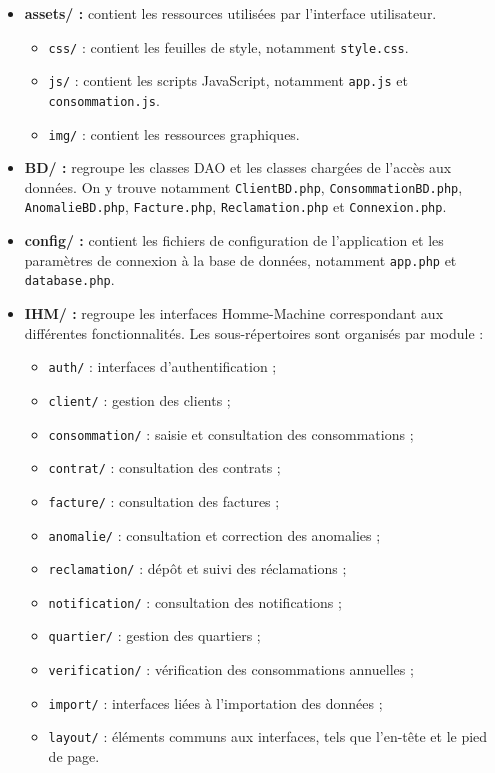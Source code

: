 \begin{itemize}[leftmargin=*]

    \item \textbf{assets/ :} contient les ressources utilisées par l'interface utilisateur.
    \begin{itemize}
        \item \texttt{css/} : contient les feuilles de style, notamment \texttt{style.css}.
        \item \texttt{js/} : contient les scripts JavaScript, notamment \texttt{app.js} et \texttt{consommation.js}.
        \item \texttt{img/} : contient les ressources graphiques.
    \end{itemize}

    \item \textbf{BD/ :} regroupe les classes DAO et les classes chargées de l'accès aux données. On y trouve notamment \texttt{ClientBD.php}, \texttt{ConsommationBD.php}, \texttt{AnomalieBD.php}, \texttt{Facture.php}, \texttt{Reclamation.php} et \texttt{Connexion.php}.

    \item \textbf{config/ :} contient les fichiers de configuration de l'application et les paramètres de connexion à la base de données, notamment \texttt{app.php} et \texttt{database.php}.

    \item \textbf{IHM/ :} regroupe les interfaces Homme-Machine correspondant aux différentes fonctionnalités. Les sous-répertoires sont organisés par module :
    \begin{itemize}
        \item \texttt{auth/} : interfaces d'authentification ;
        \item \texttt{client/} : gestion des clients ;
        \item \texttt{consommation/} : saisie et consultation des consommations ;
        \item \texttt{contrat/} : consultation des contrats ;
        \item \texttt{facture/} : consultation des factures ;
        \item \texttt{anomalie/} : consultation et correction des anomalies ;
        \item \texttt{reclamation/} : dépôt et suivi des réclamations ;
        \item \texttt{notification/} : consultation des notifications ;
        \item \texttt{quartier/} : gestion des quartiers ;
        \item \texttt{verification/} : vérification des consommations annuelles ;
        \item \texttt{import/} : interfaces liées à l'importation des données ;
        \item \texttt{layout/} : éléments communs aux interfaces, tels que l'en-tête et le pied de page.
    \end{itemize}


\end{itemize}
